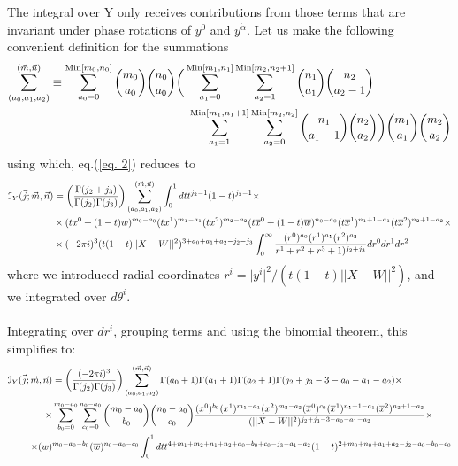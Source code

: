 \documentclass[a4paper,11pt]{article}
\begin{document}
The integral over Y only receives contributions from those terms that are invariant under phase rotations of $y^0$ and $y^{\dot{\alpha}}$. Let us make the following convenient definition for the summations
\begingroup \allowdisplaybreaks \begin{align}
    \sum_{(a_0,a_1,a_2)}^{(\vec{m},\vec{n})} \equiv \sum_{a_0=0}^{\text{Min}[m_0,n_0]} {m_0 \choose a_0}{n_0 \choose a_0} &\bigg( \sum_{a_1=0}^{\text{Min}[m_1,n_1]} \sum_{a_2=1}^{\text{Min}[m_2,n_2+1]} {n_1 \choose a_1}  {n_2 \choose a_2-1}  \\ &- \sum_{a_1=1}^{\text{Min}[m_1,n_1+1]} \sum_{a_2=0}^{\text{Min}[m_2,n_2]} {n_1 \choose a_1-1}  {n_2 \choose a_2}\bigg) {m_1 \choose a_1} {m_2 \choose a_2} \notag
\end{align} \endgroup
using which, eq.(\ref{eq. 2}) reduces to
\begingroup \allowdisplaybreaks \begin{align}
\mathcal{I}_Y (\vec{j};\vec{m}, \vec{n}) &= \bigg( \frac{\Gamma(j_2+j_3)}{\Gamma(j_2) \Gamma(j_3)} \bigg) \sum_{(a_0,a_1,a_2)}^{(\vec{m},\vec{n})} \int_0^1 dt t^{j_2-1} (1-t)^{j_3-1}  \times \\
    &\times (tx^0+(1-t)w)^{m_0-a_0} (tx^1)^{m_1-a_1}(tx^2)^{m_2-a_2}(t\overline{x}^0+(1-t)\overline{w})^{n_0-a_0} (t\overline{x}^1)^{n_1+1-a_1}(t\overline{x}^2)^{n_2+1-a_2} \times \notag\\
    & \times (-2 \pi i)^3 (t(1-t) \vert \vert X-W \vert \vert^2)^{3+a_0+a_1+a_2-j_2-j_3} \int_0^{\infty} \frac{(r^0)^{a_0} (r^1)^{a_1} (r^2)^{a_2} }{r^1+r^2+r^3+1)^{j_2+j_3}} dr^0 dr^1 dr^2 \notag
\end{align} \endgroup
where we introduced radial coordinates $r^i = \vert y^i \vert^2/(t(1-t)\vert \vert X-W \vert \vert^2)$, and we integrated over $d\theta^i$. \\ \\
Integrating over $dr^i$, grouping terms and using the binomial theorem, this simplifies to:
\begingroup \allowdisplaybreaks \begin{align}
\mathcal{I}_Y (\vec{j};\vec{m}, \vec{n}) &= \bigg( \frac{(-2\pi i)^3}{\Gamma(j_2) \Gamma(j_3)} \bigg) \sum_{(a_0,a_1,a_2)}^{(\vec{m},\vec{n})} \Gamma(a_0+1) \Gamma(a_1+1) \Gamma(a_2+1) \Gamma(j_2+j_3-3-a_0-a_1-a_2) \times \notag \\
\times& \sum_{b_0=0}^{m_0-a_0} \sum_{c_0=0}^{n_0-a_0} {m_0-a_0 \choose b_0} {n_0 -a_0 \choose c_0} \frac{(x^0)^{b_0} (x^1)^{m_1-a_1} (x^2)^{m_2-a_2} (\overline{x}^0)^{c_0} (\overline{x}^1)^{n_1+1-a_1} (\overline{x}^2)^{n_2+1-a_2}}{(\vert \vert X-W \vert \vert^2)^{j_2+j_3-3-a_0-a_1-a_2}} \times \notag \\
\times (w)&^{m_0-a_0-b_0} (\overline{w})^{n_0-a_0-c_0} \int_0^1 dt t^{4+m_1+m_2+n_1+n_2+a_0+b_0+c_0-j_3-a_1-a_2} (1-t)^{2+m_0+n_0+a_1+a_2-j_2-a_0-b_0-c_0} \notag
\end{align} \endgroup
\end{document}
